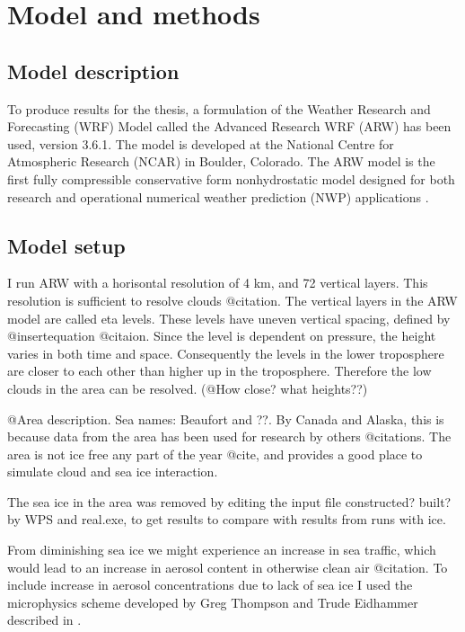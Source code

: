\chapter{Model and methods}
\label{chap:modmet}
\section{Model description}
\label{sec:modeldes}
To produce results for the thesis, a formulation of the Weather Research and Forecasting (WRF) Model called the Advanced Research WRF (ARW) has been used, version 3.6.1. The model is developed at the National Centre for Atmospheric Research (NCAR) in Boulder, Colorado. The ARW model is the first fully compressible conservative form nonhydrostatic model designed for both research and operational numerical weather prediction (NWP) applications \citep{Skamarock2008}.

\section{Model setup}
\label{sec:modelset}
I run ARW with a horisontal resolution of 4 km, and 72 vertical layers. This resolution is sufficient to resolve clouds @citation.
The vertical layers in the ARW model are called eta levels. These levels have uneven vertical spacing, defined by @insertequation @citaion. Since the level is dependent on pressure, the height varies in both time and space. Consequently the levels in the lower troposphere are closer to each other than higher up in the troposphere. Therefore the low clouds in the area can be resolved. (@How close? what heights??)

@Area description. Sea names: Beaufort and ??. By Canada and Alaska, this is because data from the area has been used for research by others @citations. The area is not ice free any part of the year @cite, and provides a good place to simulate cloud and sea ice interaction.

The sea ice in the area was removed by editing the input file constructed? built? by WPS and real.exe, to get results to compare with results from runs with ice.

From diminishing sea ice we might experience an increase in sea traffic, which would lead to an increase in aerosol content in otherwise clean air @citation. To include increase in aerosol concentrations due to lack of sea ice I used the microphysics scheme developed by Greg Thompson and Trude Eidhammer described in \cite{Thompson2014}.

